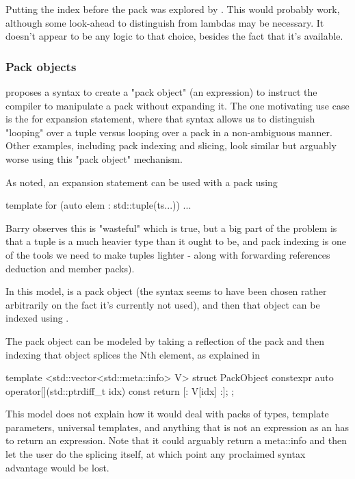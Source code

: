 \documentclass{wg21}
\begin{document}
Putting the index before the pack was explored by .
This would probably work, although some look-ahead to distinguish from lambdas may be necessary.
It doesn't appear to be any logic to that choice, besides the fact that it's available.

\subsubsection{Pack objects}

 proposes a syntax to create a "pack object" (an expression) to instruct the compiler to manipulate a pack without expanding it.
The one motivating use case is the for expansion statement, where that syntax allows us to distinguish "looping" over a tuple versus looping over a pack in a non-ambiguous manner.
Other examples, including pack indexing and slicing, look similar but arguably worse using this "pack object" mechanism.

As noted, an expansion statement can be used with a pack using

\begin{colorblock}
    template for (auto elem : std::tuple(ts...)) { ... }
\end{colorblock}

Barry observes this is "wasteful" which is true, but a big part of the problem is that a tuple is a much heavier type than it ought to be,
and pack indexing is one of the tools we need to make tuples lighter - along with forwarding references deduction and member packs).


In this model,  is a pack object (the syntax seems to have been chosen rather arbitrarily on the fact it's currently not used),
and then that object can be indexed using .

The pack object can be modeled by taking a reflection of the pack and then indexing that object splices the Nth element, as explained in 

\begin{colorblock}
template <std::vector<std::meta::info> V>
struct PackObject {
    constexpr auto operator[](std::ptrdiff_t idx) const {
        return [: V[idx] :];
    }
};
\end{colorblock}

This model does not explain how it would deal with packs of types, template parameters, universal templates, and anything that is not an expression as an 
has to return an expression.
Note that it could arguably return a meta::info and then let the user do the splicing itself, at which point any proclaimed syntax advantage would be lost.
\end{document}
